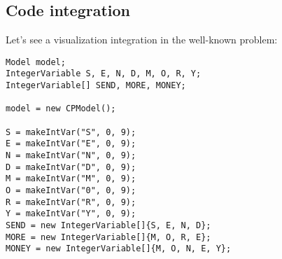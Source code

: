\subsection{Code integration}\label{chocoandcpviz:codeintegration}\hypertarget{chocoandcpviz:codeintegration}{}
Let's see a visualization integration in the well-known  problem:

\begin{lstlisting}[title=SendMoreMoney problem,captionpos=b]  
Model model;                                                                                                     
IntegerVariable S, E, N, D, M, O, R, Y;                                                                          
IntegerVariable[] SEND, MORE, MONEY;                                                                             
                                                                                                                 
model = new CPModel();                                                                                           
                                                                                                                 
S = makeIntVar("S", 0, 9);                                                                                       
E = makeIntVar("E", 0, 9);                                                                                       
N = makeIntVar("N", 0, 9);                                                                                       
D = makeIntVar("D", 0, 9);                                                                                       
M = makeIntVar("M", 0, 9);                                                                                       
O = makeIntVar("0", 0, 9);                                                                                       
R = makeIntVar("R", 0, 9);                                                                                       
Y = makeIntVar("Y", 0, 9);                                                                                       
SEND = new IntegerVariable[]{S, E, N, D};                                                                        
MORE = new IntegerVariable[]{M, O, R, E};                                                                        
MONEY = new IntegerVariable[]{M, O, N, E, Y};                                                                    
                                                                                                                 

\end{lstlisting}
